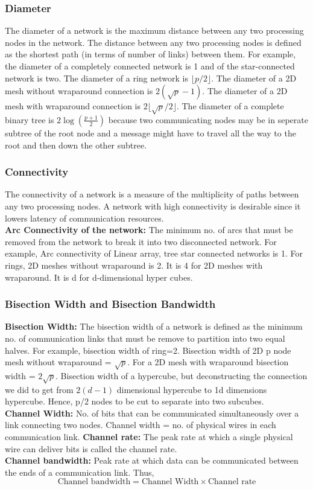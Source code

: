 \documentclass[12pt]{article}
\begin{document}
\subsubsection{Diameter} 
The diameter of a network is the maximum distance between any two processing nodes in the network. The distance between 
any two processing nodes is defined as the shortest path (in terms of number of links) between them. 
For example, the diameter of a completely connected network is 1 and of the star-connected network is two. The diameter of 
a ring network is $\lfloor p/2 \rfloor$. The diameter of a 2D mesh without wraparound connection is $2(\sqrt{p}-1)$.
The diameter of a 2D mesh with wraparound connection is $2\lfloor\sqrt{p}/2\rfloor$.
The diameter of a complete binary tree is $2\log(\frac{p+1}{2})$ because two communicating nodes may be in seperate subtree of the root node and a message might have to travel
all the way to the root and then down the other subtree.

\subsubsection{Connectivity}
The connectivity of a network is a measure of the multiplicity of paths between any two processing nodes. A network with high connectivity is desirable since it lowers latency of communication resources.\\
\textbf{Arc Connectivity of the network: }The minimum no. of arcs that must be removed from the network to break it into two disconnected network. 
For example, Arc connectivity of Linear array, tree star connected networks is 1. 
For rings, 2D meshes without wraparound is 2. It is 4 for 2D meshes with wraparound. It is d for d-dimensional hyper cubes.

\subsubsection{Bisection Width and Bisection Bandwidth}
\textbf{Bisection Width: }The bisection width of a network is defined as the minimum no. of communication links that must be remove to partition into
two equal halves. For example, bisection width of ring=2. Bisection width of 2D p node mesh without wraparound = $\sqrt{p}$. For a 2D mesh with wraparound bisection 
width = $2\sqrt{p}$. Bisection width of a hypercube, but deconstructing the connection we did to get from $2(d-1)$ dimensional hypercube to 1d dimensions hypercube. Hence, 
p/2 nodes to be cut to separate into two subcubes.\\
\textbf{Channel Width: } No. of bits that can be communicated simultaneously over a link connecting two nodes. Channel width = no. of physical wires in each communication link.
\textbf{Channel rate: }The peak rate at which a single physical wire can deliver bits is called the channel rate.\\
\textbf{Channel bandwidth: }Peak rate at which data can be communicated between the ends of a communication link.
Thus, 
\begin{equation}
    \text{Channel bandwidth} = \text{Channel Width} \times \text{Channel rate}
\end{equation}
\end{document}
